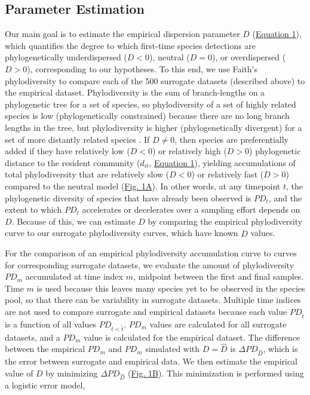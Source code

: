 \documentclass{article}
\begin{document}
\subsection{Parameter Estimation} \label{sec:parameterEstimation}
Our main goal is to estimate the empirical dispersion parameter \(D\) (\hyperref[sec:equation1]{Equation 1}), which quantifies the degree to which first-time species detections are phylogenetically underdispersed (\(D<0\)), neutral (\(D=0\)), or overdispersed (\(D>0\)), corresponding to our hypotheses. To this end, we use Faith's phylodiversity \cite{Faith1992} to compare each of the 500 surrogate datasets (described above) to the empirical dataset. Phylodiversity is the sum of branch-lengths on a phylogenetic tree for a set of species, so phylodiversity of a set of highly related species is low (phylogenetically constrained) because there are no long branch lengths in the tree, but phylodiversity is higher (phylogenetically divergent) for a set of more distantly related species \cite{Faith1992}. If \(D\neq0\), then species are preferentially added if they have relatively low (\(D<0\)) or relatively high (\(D>0\)) phylogenetic distance to the resident community (\(d_{it}\), \hyperref[sec:equation1]{Equation 1}), yielding accumulations of total phylodiversity that are relatively slow (\(D<0\)) or relatively fast (\(D>0\)) compared to the neutral model (\hyperref[sec:figure1]{Fig. 1A}). In other words, at any timepoint \(t\), the phylogenetic diversity of species that have already been observed is \(PD_t\), and the extent to which \(PD_t\) accelerates or decelerates over a sampling effort depends on \(D\). Because of this, we can estimate \(D\) by comparing the empirical phylodiversity curve to our surrogate phylodiversity curves, which have known \(\hat{D}\) values.
\par
For the comparison of an empirical phylodiversity accumulation curve to curves for corresponding surrogate datasets, we evaluate the amount of phylodiversity \(PD_m\) accumulated at time index \(m\), midpoint between the first and final samples. Time \(m\) is used because this leaves many species yet to be observed in the species pool, so that there can be variability in surrogate datasets. Multiple time indices are not used to compare surrogate and empirical datasets because each value \(PD_{\hat{t}}\) is a function of all values \(PD_{t<\hat{t}}\). \(PD_m\) values are calculated for all surrogate datasets, and a \(PD_m\) value is calculated for the empirical dataset. The difference between the empirical \(PD_m\) and \(PD_m\) simulated with \(D=\hat{D}\) is \(\Delta PD_{\hat{D}}\), which is the error between surrogate and empirical data. We then estimate the empirical value of \(D\) by minimizing \(\Delta PD_{\hat{D}}\) (\hyperref[sec:figure1]{Fig. 1B}). This minimization is performed using a logistic error model,
\end{document}
